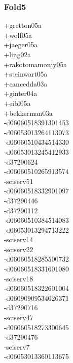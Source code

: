 \begin{multicols}{3}
\subsubsection*{Fold5}
+gretton05a\\
+wolf05a\\
+jaeger05a\\
+ling02a\\
+rakotomamonjy05a\\
+steinwart05a\\
+cancedda03a\\
+ginter04a\\
+eibl05a\\
+bekkerman03a\\
-d06060518391301453\\
-d06053013264113073\\
-d06060510434514330\\
-d06053013245412933\\
-d37290624\\
-d06060510265913574\\
-sciserv51\\
-d06060518332901097\\
-d37290446\\
-d37290112\\
-d06060510384514083\\
-d06053013294713222\\
-sciserv14\\
-sciserv22\\
-d06060518285500732\\
-d06060518331601080\\
-sciserv18\\
-d06060518322601004\\
-d06090909534026371\\
-d37290716\\
-sciserv47\\
-d06060518273300645\\
-d37290476\\
-sciserv7\\
-d06053013360113675\\

\end{multicols}
